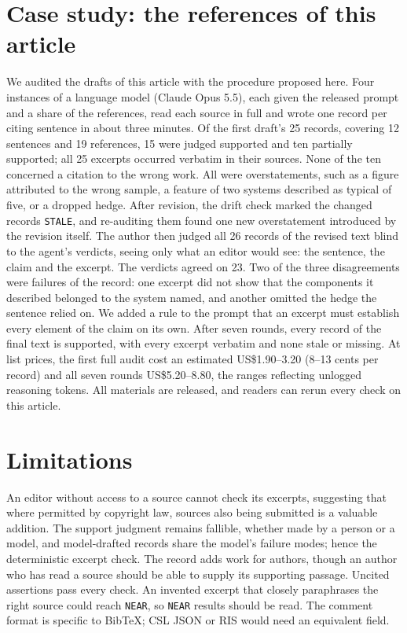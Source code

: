 \documentclass[11pt]{article}
\begin{document}
\section{Case study: the references of this article}

We audited the drafts of this article with the procedure proposed here. Four instances of a language model (Claude Opus 5.5), each given the released prompt and a share of the references, read each source in full and wrote one record per citing sentence in about three minutes. Of the first draft's 25 records, covering 12 sentences and 19 references, 15 were judged supported and ten partially supported; all 25 excerpts occurred verbatim in their sources. None of the ten concerned a citation to the wrong work. All were overstatements, such as a figure attributed to the wrong sample, a feature of two systems described as typical of five, or a dropped hedge. After revision, the drift check marked the changed records \texttt{STALE}, and re-auditing them found one new overstatement introduced by the revision itself. The author then judged all 26 records of the revised text blind to the agent's verdicts, seeing only what an editor would see: the sentence, the claim and the excerpt. The verdicts agreed on 23. Two of the three disagreements were failures of the record: one excerpt did not show that the components it described belonged to the system named, and another omitted the hedge the sentence relied on. We added a rule to the prompt that an excerpt must establish every element of the claim on its own. After seven rounds, every record of the final text is supported, with every excerpt verbatim and none stale or missing. At list prices, the first full audit cost an estimated US\$1.90--3.20 (8--13 cents per record) and all seven rounds US\$5.20--8.80, the ranges reflecting unlogged reasoning tokens. All materials are released, and readers can rerun every check on this article.

\section{Limitations}

An editor without access to a source cannot check its excerpts, suggesting that where permitted by copyright law, sources also being submitted is a valuable addition. The support judgment remains fallible, whether made by a person or a model, and model-drafted records share the model's failure modes; hence the deterministic excerpt check. The record adds work for authors, though an author who has read a source should be able to supply its supporting passage. Uncited assertions pass every check. An invented excerpt that closely paraphrases the right source could reach \texttt{NEAR}, so \texttt{NEAR} results should be read. The comment format is specific to BibTeX; CSL JSON or RIS would need an equivalent field.
\end{document}
